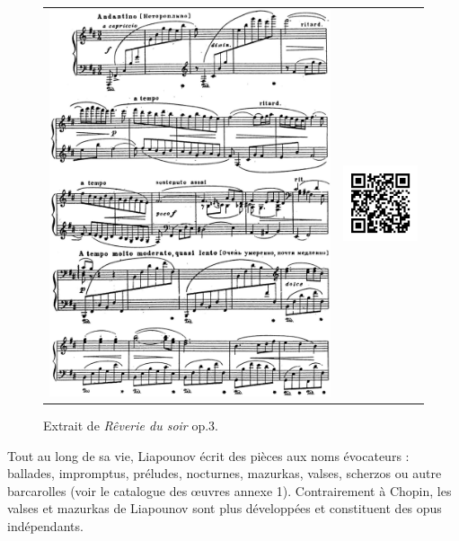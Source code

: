 \begin{figure}[!h]
  \begin{bigcenter}
    \begin{tabular}{lr}
      \includegraphics[width=11.25cm, keepaspectratio]{op3.png}
      &
      \includegraphics[width=3cm, keepaspectratio]{op3-qr.png}
    \end{tabular}
  \end{bigcenter}
  \caption{\label{op3}Extrait de \emph{Rêverie du soir} op.3.}
\end{figure}

Tout au long de sa vie, Liapounov écrit des pièces aux noms évocateurs : ballades, impromptus, préludes, nocturnes, mazurkas, valses, scherzos ou autre barcarolles (voir le catalogue des œuvres annexe 1). Contrairement à Chopin, les valses et mazurkas de Liapounov sont plus développées et constituent des opus indépendants.

